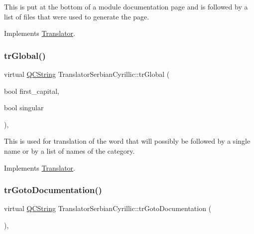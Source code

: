 This is put at the bottom of a module documentation page and is followed by a list of files that were used to generate the page. 

Implements \mbox{\hyperlink{class_translator}{Translator}}.

\mbox{\label{class_translator_serbian_cyrillic_aa68a3ebc8e9d1abf363203338eab2852}} 
\subsubsection{\texorpdfstring{trGlobal()}{trGlobal()}}
{\footnotesize\ttfamily virtual \mbox{\hyperlink{class_q_c_string}{Q\+C\+String}} Translator\+Serbian\+Cyrillic\+::tr\+Global (\begin{DoxyParamCaption}\item[{bool}]{first\+\_\+capital,  }\item[{bool}]{singular }\end{DoxyParamCaption})\hspace{0.3cm}{\ttfamily [inline]}, {\ttfamily [virtual]}}

This is used for translation of the word that will possibly be followed by a single name or by a list of names of the category. 

Implements \mbox{\hyperlink{class_translator}{Translator}}.

\mbox{\label{class_translator_serbian_cyrillic_aed7a94e0650e6fdfa375a942c42eb767}} 
\subsubsection{\texorpdfstring{trGotoDocumentation()}{trGotoDocumentation()}}
{\footnotesize\ttfamily virtual \mbox{\hyperlink{class_q_c_string}{Q\+C\+String}} Translator\+Serbian\+Cyrillic\+::tr\+Goto\+Documentation (\begin{DoxyParamCaption}{ }\end{DoxyParamCaption})\hspace{0.3cm}{\ttfamily [inline]}, {\ttfamily [virtual]}}


